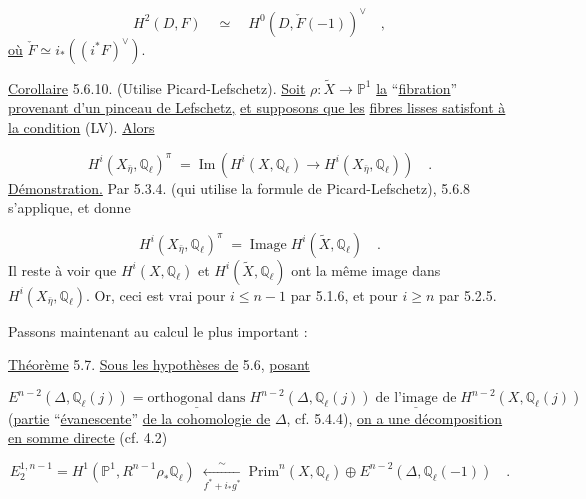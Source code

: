\begin{equation*}
H^2(D,F) \quad \simeq \quad H^0(D,\check{F}(-1))^{\vee} \quad ,
\end{equation*}
\underline{où} $\check{F} \simeq i_*((i^*F)^{\vee})$.

\underline{Corollaire} 5.6.10. (Utilise Picard-Lefschetz). \underline{Soit} $\rho : \tilde{X} \longrightarrow \mathbb{P}^1$ \underline{la} ``\underline{fibration}'' \underline{provenant d'un pinceau de Lefschetz,} \underline{et supposons que les} \underline{fibres lisses satisfont à la condition} (LV). \underline{Alors}

\begin{equation}\tag{5.6.10.1}
H^i(X_{\bar{\eta}},\mathbb{Q}_\ell)^{\pi} \;=\; \mathrm{Im}\,(H^i(X,\mathbb{Q}_\ell) \longrightarrow H^i(X_{\bar{\eta}},\mathbb{Q}_\ell)) \quad .
\end{equation}
\underline{Démonstration.} Par 5.3.4. (qui utilise la formule de Picard-Lefschetz), 5.6.8 s'applique, et donne

\begin{equation*}
H^i(X_{\bar{\eta}},\mathbb{Q}_\ell)^{\pi} \;=\; \mathrm{Image}\; H^i(\tilde{X},\mathbb{Q}_\ell) \quad .
\end{equation*}
Il reste à voir que $H^i(X,\mathbb{Q}_\ell)$ et $H^i(\tilde{X},\mathbb{Q}_\ell)$ ont la même image dans $H^i(X_{\bar{\eta}},\mathbb{Q}_\ell)$. Or, ceci est vrai pour $i \leq n-1$ par 5.1.6, et pour $i \geq n$ par 5.2.5.

Passons maintenant au calcul le plus important :

\underline{Théorème} 5.7. \underline{Sous les hypothèses de} 5.6, \underline{posant}

\begin{equation*}
E^{n-2}(\Delta,\mathbb{Q}_\ell(j)) = \underline{\mbox{orthogonal dans}}\; H^{n-2}(\Delta,\mathbb{Q}_\ell(j)) \; \underline{\mbox{de l'image de}} \; H^{n-2}(X,\mathbb{Q}_\ell(j))
\end{equation*}
(\underline{partie} ``\underline{évanescente}'' \underline{de la cohomologie de} $\Delta$, cf. 5.4.4), \underline{on a une décomposition en somme directe} (cf. 4.2)

\begin{equation}\tag{5.7.1}
E_2^{1,n-1} = H^1(\mathbb{P}^1, R^{n-1}\rho_*\mathbb{Q}_\ell) \;\xleftarrow[f^*+i_*g^*]{\sim}\; \mathrm{Prim}^n(X,\mathbb{Q}_\ell) \oplus E^{n-2}(\Delta,\mathbb{Q}_\ell(-1)) \quad .
\end{equation}


